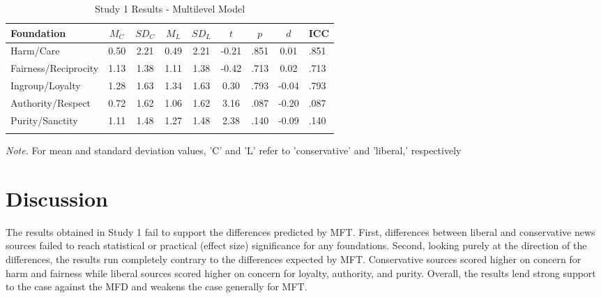 \documentclass[
  man,floatsintext]{apa6}
\begin{document}
\begin{table}[h]

\begin{center}
\begin{threeparttable}

\caption{\label{tab:exp1-table}Study 1 Results - Multilevel Model}

\footnotesize{

\begin{tabular}{lcccccccl}
\toprule
Foundation & $M_C$ & $SD_C$ & $M_L$ & $SD_L$ & $t$ & $p$ & $d$ & ICC\\
\midrule
Harm/Care & 0.50 & 2.21 & 0.49 & 2.21 & -0.21 & .851 & 0.01 & .851\\
Fairness/Reciprocity & 1.13 & 1.38 & 1.11 & 1.38 & -0.42 & .713 & 0.02 & .713\\
Ingroup/Loyalty & 1.28 & 1.63 & 1.34 & 1.63 & 0.30 & .793 & -0.04 & .793\\
Authority/Respect & 0.72 & 1.62 & 1.06 & 1.62 & 3.16 & .087 & -0.20 & .087\\
Purity/Sanctity & 1.11 & 1.48 & 1.27 & 1.48 & 2.38 & .140 & -0.09 & .140\\
\bottomrule
\addlinespace
\end{tabular}

}

\begin{tablenotes}[para]
\normalsize{\textit{Note.} For mean and standard deviation values, 'C' and 'L' refer to 'conservative' and 'liberal,' respectively}
\end{tablenotes}

\end{threeparttable}
\end{center}

\end{table}

\hypertarget{discussion}{%
\section{Discussion}\label{discussion}}

The results obtained in Study 1 fail to support the differences predicted by MFT. First, differences between liberal and conservative news sources failed to reach statistical or practical (effect size) significance for any foundations. Second, looking purely at the direction of the differences, the results run completely contrary to the differences expected by MFT. Conservative sources scored higher on concern for harm and fairness while liberal sources scored higher on concern for loyalty, authority, and purity. Overall, the results lend strong support to the case against the MFD and weakens the case generally for MFT.
\end{document}
